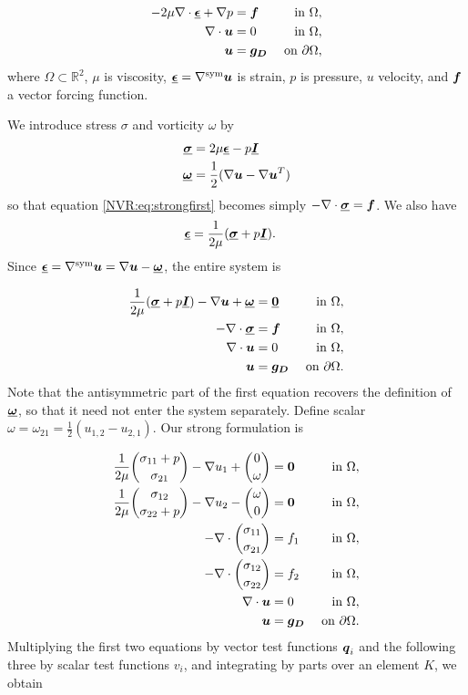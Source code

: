 \begin{align}
- 2 \mu \NVRdiv \NVRtensor{\epsilon} + \NVRgrad p &= \vect{f} & \text{ in } \Omega, \label{NVR:eq:strongfirst} \\
\NVRdiv \vect{u} &= 0 & \text{ in } \Omega, \\
\vect{u} &= \vect{g_{D}} & \text{ on } \partial\Omega,\label{NVR:eq:stronglast}
\end{align}
where $\Omega \subset \mathbb{R}^{2}$, $\mu$ is viscosity, $\NVRtensor{\epsilon}=\NVRgrad^{\text{sym}} \vect{u}$ is strain, $p$ is pressure, $u$ velocity, and $\vect{f}$ a vector forcing function.

We introduce stress $\sigma$ and vorticity $\omega$ by
\begin{align*}
\NVRtensor{\sigma} &= 2 \mu \NVRtensor{\epsilon} - p\NVRtensor{I}\\
\NVRtensor{\omega} &= \frac{1}{2}(\NVRgrad \vect{u} - \NVRgrad \vect{u}^{T})
\end{align*}
so that equation \eqref{NVR:eq:strongfirst} becomes simply $-\NVRdiv \NVRtensor{\sigma} = \vect{f}$.
We also have
\begin{align*}
\NVRtensor{\epsilon} &= \frac{1}{2 \mu}(\NVRtensor{\sigma} + p\NVRtensor{I}).
\end{align*}
Since $\NVRtensor{\epsilon} = \NVRgrad^{\text{sym}} \vect{u} = \NVRgrad \vect{u} - \NVRtensor{\omega}$, the entire system is

\begin{align*}
\frac{1}{2 \mu}(\NVRtensor{\sigma} + p\NVRtensor{I}) - \NVRgrad \vect{u} + \NVRtensor{\omega} &= \NVRtensor{0}  & \text{ in } \Omega, \\
- \NVRdiv \NVRtensor{\sigma} &= \vect{f} & \text{ in } \Omega, \\
\NVRdiv \vect{u} &= 0 & \text{ in } \Omega, \\
\vect{u} &= \vect{g_{D}} & \text{ on } \partial\Omega.
\end{align*}
Note that the antisymmetric part of the first equation recovers the definition of $\NVRtensor{\omega}$, so that it need not enter the system separately.
Define scalar $\omega = \omega_{21} = \frac{1}{2}(u_{1,2} - u_{2,1})$.  Our strong formulation is

\begin{align*}
\frac{1}{2 \mu}{\sigma_{11} + p \choose \sigma_{21}} - \NVRgrad u_{1} + {0 \choose \omega} &= \vect{0} & \text{ in } \Omega, \\
\frac{1}{2 \mu}{\sigma_{12} \choose \sigma_{22} + p} - \NVRgrad u_{2} - {\omega \choose 0} &= \vect{0}  & \text{ in } \Omega, \\
-\NVRdiv {\sigma_{11} \choose \sigma_{21}} &= f_{1} & \text{ in } \Omega, \\
-\NVRdiv {\sigma_{12} \choose \sigma_{22}} &= f_{2} & \text{ in } \Omega, \\
\NVRdiv \vect{u} &= 0 & \text{ in } \Omega, \\\
\vect{u} &= \vect{g_{D}} & \text{ on } \partial\Omega.
\end{align*}
Multiplying the first two equations by vector test functions $\vect{q}_{i}$ and the following three by scalar test functions $v_{i}$, and integrating by parts over an element $K$, we obtain

